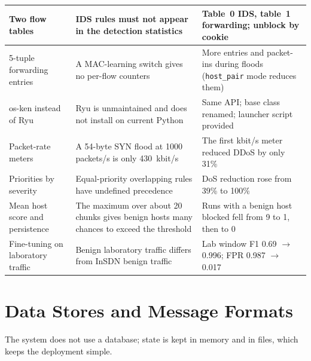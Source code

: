 \begin{longtable}{|p{3.6cm}|p{5.0cm}|p{5.4cm}|}
Two flow tables & IDS rules must not appear in the detection statistics & Table~0 IDS, table~1 forwarding; unblock by cookie \\ \hline
5-tuple forwarding entries & A MAC-learning switch gives no per-flow counters & More entries and packet-ins during floods (\texttt{host\_pair} mode reduces them) \\ \hline
os-ken instead of Ryu & Ryu is unmaintained and does not install on current Python & Same API; base class renamed; launcher script provided \\ \hline
Packet-rate meters & A 54-byte SYN flood at 1000 packets/s is only 430~kbit/s & The first kbit/s meter reduced DDoS by only 31\% \\ \hline
Priorities by severity & Equal-priority overlapping rules have undefined precedence & DoS reduction rose from 39\% to 100\% \\ \hline
Mean host score and persistence & The maximum over about 20 chunks gives benign hosts many chances to exceed the threshold & Runs with a benign host blocked fell from 9 to 1, then to 0 \\ \hline
Fine-tuning on laboratory traffic & Benign laboratory traffic differs from InSDN benign traffic & Lab window F1 0.69 $\to$ 0.996; FPR 0.987 $\to$ 0.017 \\ \hline
\end{longtable}

\section{Data Stores and Message Formats}
The system does not use a database; state is kept in memory and in files, which keeps the deployment simple.

